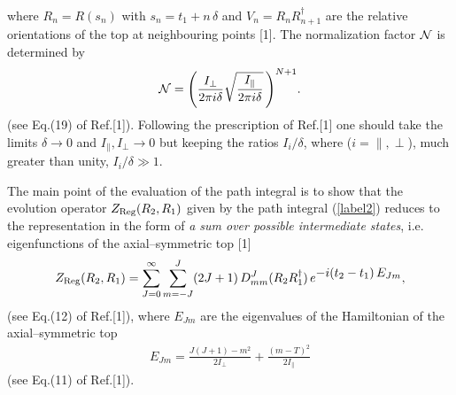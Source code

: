 \documentclass[a4paper,11pt]{article}
\begin{document}
%
where $R_n = R(s_n)$ with $s_n = t_1 + n\,\delta$ and $V_n = R_n
R^{\dagger}_{n+1}$ are the relative orientations of the top at
neighbouring points [1]. The normalization factor ${\cal N}$ is
determined by
%
\begin{eqnarray}\label{label5}
{\cal N} = \Bigg(\frac{I_{\perp}}{2\pi i
\delta}\sqrt{\frac{I_{\parallel}}{2\pi i \delta}}\,\Bigg)^{N+1}.
\end{eqnarray}
%
(see Eq.(19) of Ref.[1]). Following the prescription of Ref.[1] one
should take the limits $\delta \to 0$ and $I_{\parallel}, I_{\perp}
\to 0$ but keeping the ratios $I_i/\delta$, where ($ i= {\parallel},
{\perp}$), much greater than unity, $I_i/\delta \gg 1$.

The main point of the evaluation of the path integral is to show that
the evolution operator $Z_{\rm Reg}(R_2,R_1)$ given by the path
integral (\ref{label2}) reduces to the representation in the form of
{\it a sum over possible intermediate states}, i.e. eigenfunctions of
the axial--symmetric top [1]
%
\begin{eqnarray}\label{label6}
Z_{\rm Reg}(R_2,R_1) =\sum^{\infty}_{J=0}\sum^J_{m = - J}(2J + 1)\,
D^J_{m m}(R_2R^{\dagger}_1)\,e^{\textstyle -i(t_2-t_1)\,E_{J m}},
\end{eqnarray}
%
(see Eq.(12) of Ref.[1]), where $E_{J m}$ are the eigenvalues of the
Hamiltonian of the axial--symmetric top 
%
\begin{eqnarray}\label{label7}
E_{J m} = \frac{J(J+1) - m^2}{2 I_{\perp}} + \frac{(m - T)^2}{2
I_{\parallel}}
\end{eqnarray}
%
(see Eq.(11) of Ref.[1]).
\end{document}
